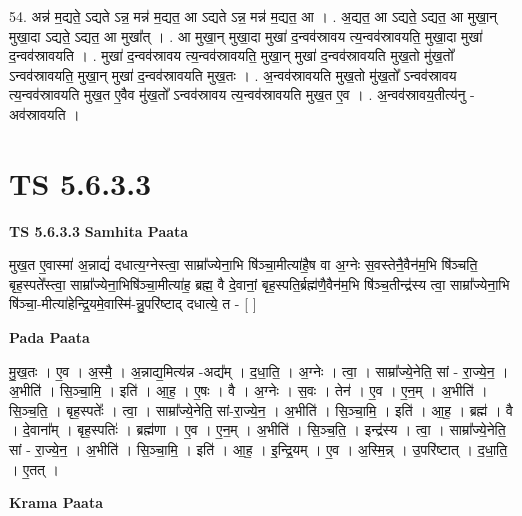 \documentclass[17pt]{extarticle}
\begin{document}
54. अन्न॑ म॒द्यते॒ ऽद्यते ऽन्न॒ मन्न॑ म॒द्यत॒ आ ऽद्यते ऽन्न॒ मन्न॑ म॒द्यत॒ आ । . अ॒द्यत॒ आ ऽद्यते॒ ऽद्यत॒ आ मुखा॒न् मुखा॒दा ऽद्यते॒ ऽद्यत॒ आ मुखा᳚त् । . आ मुखा॒न् मुखा॒दा मुखा॑ द॒न्वव॑स्रावय त्य॒न्वव॑स्रावयति॒ मुखा॒दा मुखा॑ द॒न्वव॑स्रावयति । . मुखा॑ द॒न्वव॑स्रावय त्य॒न्वव॑स्रावयति॒ मुखा॒न् मुखा॑ द॒न्वव॑स्रावयति मुख॒तो मु॑ख॒तो᳚ ऽन्वव॑स्रावयति॒ मुखा॒न् मुखा॑ द॒न्वव॑स्रावयति मुख॒तः । . अ॒न्वव॑स्रावयति मुख॒तो मु॑ख॒तो᳚ ऽन्वव॑स्रावय त्य॒न्वव॑स्रावयति मुख॒त ए॒वैव मु॑ख॒तो᳚ ऽन्वव॑स्रावय त्य॒न्वव॑स्रावयति मुख॒त ए॒व । . अ॒न्वव॑स्रावय॒तीत्य॑नु - अव॑स्रावयति । \newline
\pagebreak
{}

\section{ TS 5.6.3.3 }

\textbf{TS 5.6.3.3 } \newline
\textbf{Samhita Paata} \newline

मुख॒त ए॒वास्मा॑ अ॒न्नाद्यं॑ दधात्य॒ग्नेस्त्वा॒ साम्रा᳚ज्येना॒भि षि॑ञ्चा॒मीत्या॑है॒ष वा अ॒ग्नेः स॒वस्तेनै॒वैन॑म॒भि षि॑ञ्चति॒ बृह॒स्पते᳚स्त्वा॒ साम्रा᳚ज्येना॒भिषि॑ञ्चा॒मीत्या॑ह॒ ब्रह्म॒ वै दे॒वानां॒ बृह॒स्पति॒र्ब्रह्म॑णै॒वैन॑म॒भि षि॑ञ्च॒तीन्द्र॑स्य त्वा॒ साम्रा᳚ज्येना॒भि षि॑ञ्चा॒-मीत्या॑हेन्द्रि॒यमे॒वास्मि॑-न्नु॒परि॑ष्टाद् दधात्ये॒ त - [  ] \newline

\textbf{Pada Paata} \newline

मु॒ख॒तः । ए॒व । अ॒स्मै॒ । अ॒न्नाद्य॒मित्य॑न्न -अद्य᳚म् । द॒धा॒ति॒ । अ॒ग्नेः । त्वा॒ । साम्रा᳚ज्ये॒नेति॒ सां - रा॒ज्ये॒न॒ । अ॒भीति॑ । सि॒ञ्चा॒मि॒ । इति॑ । आ॒ह॒ । ए॒षः । वै । अ॒ग्नेः । स॒वः । तेन॑ । ए॒व । ए॒न॒म् । अ॒भीति॑ । सि॒ञ्च॒ति॒ । बृह॒स्पतेः᳚ । त्वा॒ । साम्रा᳚ज्ये॒नेति॒ सां-रा॒ज्ये॒न॒ । अ॒भीति॑ । सि॒ञ्चा॒मि॒ । इति॑ । आ॒ह॒ । ब्रह्म॑ । वै । दे॒वाना᳚म् । बृह॒स्पतिः॑ । ब्रह्म॑णा । ए॒व । ए॒न॒म् । अ॒भीति॑ । सि॒ञ्च॒ति॒ । इन्द्र॑स्य । त्वा॒ । साम्रा᳚ज्ये॒नेति॒ सां - रा॒ज्ये॒न॒ । अ॒भीति॑ । सि॒ञ्चा॒मि॒ । इति॑ । आ॒ह॒ । इ॒न्द्रि॒यम् । ए॒व । अ॒स्मि॒न्न् । उ॒परि॑ष्टात् । द॒धा॒ति॒ । ए॒तत् ।  \newline


\textbf{Krama Paata} \newline
\end{document}
